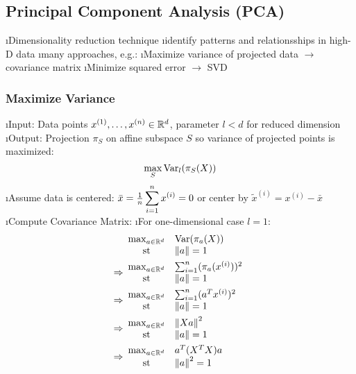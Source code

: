 \subsection{Principal Component Analysis (PCA)}

\bi
\i Dimensionality reduction technique
\i identify patterns and relationsships in high-D data
\i many approaches, e.g.:
\bi
\i Maximize variance of projected data $\to$ covariance matrix
\i Minimize squared error $\to$ SVD
\ei
\ei

\subsubsection{Maximize Variance}

\be
\i Input: Data points $x^{(1)}, \ldots, x^{(n)} \in \mathbb{R}^d$, parameter $l < d$ for reduced dimension
\i Output: Projection $\pi_S$ on affine subspace $S$ so variance of projected points is maximized: \[
\max_S \text{Var}_l(\pi_S(X))
\]
\i Assume data is centered: $\bar x = \frac{1}{n} \displaystyle\sum^n_{{i}=1} x^{(i)} = 0$ or center by $\tilde x^{(i)} = x^{(i)} - \bar x$
\i Compute Covariance Matrix:
\bi
\i For one-dimensional case $l=1$:
\begin{align*}
&
\begin{array}{cl}
\max_{a \in \mathbb{R}^d} & \text{Var}(\pi_a(X)) \\
\text{st} & \left\lVert a\right\rVert = 1
\end{array} \\
\Rightarrow&
\begin{array}{cl}
\max_{a \in \mathbb{R}^d} & \sum_{i=1}^n (\pi_a(x^{(i)}))^2\\
\text{st} & \left\lVert a\right\rVert = 1
\end{array} \\
\Rightarrow&
\begin{array}{cl}
\max_{a \in \mathbb{R}^d} & \sum_{i=1}^n (a^Tx^{(i)})^2\\
\text{st} & \left\lVert a\right\rVert = 1
\end{array} \\
\Rightarrow&
\begin{array}{cl}
\max_{a \in \mathbb{R}^d} & \left\lVert Xa\right\rVert^2\\
\text{st} & \left\lVert a\right\rVert = 1
\end{array} \\
\Rightarrow&
\begin{array}{cl}
\max_{a \in \mathbb{R}^d} & a^T(X^TX)a\\
\text{st} & \left\lVert a\right\rVert^2 = 1
\end{array} \\
\end{align*}
